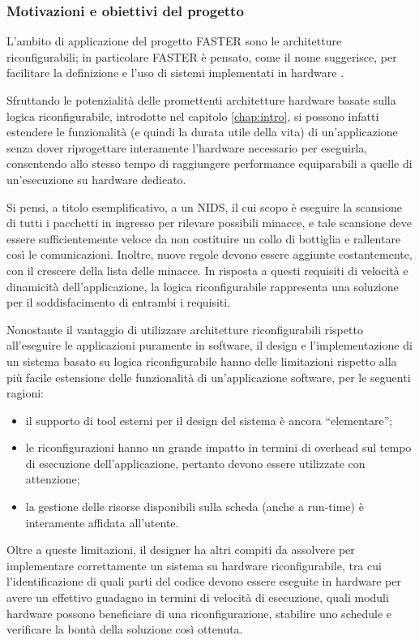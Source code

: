 \subsubsection{Motivazioni e obiettivi del progetto}
L'ambito di applicazione del progetto \ac{FASTER} sono le architetture 
riconfigurabili; in particolare \ac{FASTER} è pensato, come il nome 
suggerisce, per facilitare la definizione e l'uso di sistemi implementati in 
hardware \cite{FasterPaper}.

Sfruttando le potenzialità delle promettenti architetture hardware basate sulla 
logica riconfigurabile, introdotte nel capitolo \ref{chap:intro}, si possono 
infatti estendere le funzionalità (e quindi la durata utile della vita) di 
un'applicazione senza dover riprogettare interamente l'hardware necessario per 
eseguirla, consentendo allo stesso tempo di raggiungere performance equiparabili 
a quelle di un'esecuzione su hardware dedicato.

Si pensi, a titolo esemplificativo, a un \ac{NIDS}, il cui scopo è eseguire la 
scansione di tutti i pacchetti in ingresso per rilevare possibili minacce, e 
tale scansione deve essere sufficientemente veloce da non costituire un collo 
di bottiglia e rallentare così le comunicazioni. Inoltre, nuove regole devono 
essere aggiunte costantemente, con il crescere della lista delle minacce. In 
risposta a questi requisiti di velocità e dinamicità dell'applicazione, la 
logica riconfigurabile rappresenta una soluzione per il soddisfacimento di 
entrambi i requisiti.

Nonostante il vantaggio di utilizzare architetture riconfigurabili rispetto 
all'eseguire le applicazioni puramente in software, il design e 
l'implementazione di un sistema basato su logica riconfigurabile hanno delle 
limitazioni rispetto alla più facile estensione delle funzionalità di 
un'applicazione software, per le seguenti ragioni:
\begin{itemize}
 \item il supporto di tool esterni per il design del sistema è ancora 
``elementare'';
 \item le riconfigurazioni hanno un grande impatto in termini di overhead sul 
tempo di esecuzione dell'applicazione, pertanto devono essere utilizzate con 
attenzione;
 \item la gestione delle risorse disponibili sulla scheda (anche a run-time) è 
interamente affidata all'utente.
\end{itemize}
Oltre a queste limitazioni, il designer ha altri compiti da assolvere per 
implementare correttamente un sistema su hardware riconfigurabile, tra cui 
l'identificazione di quali parti del codice devono essere eseguite in hardware 
per avere un effettivo guadagno in termini di velocità di esecuzione, quali 
moduli hardware possono beneficiare di una riconfigurazione, stabilire uno 
schedule e verificare la bontà della soluzione così ottenuta.

